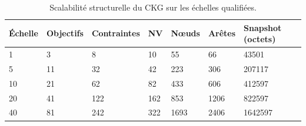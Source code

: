 \begin{table}[t]
\centering
\caption{Scalabilité structurelle du CKG sur les échelles qualifiées.}
\label{tab:v3-scalability-structural}
\small
\begin{tabular}{p{}p{}p{}p{}p{}p{}p{}}
\hline
Échelle & Objectifs & Contraintes & NV & Nœuds & Arêtes & Snapshot (octets) \\
\hline
1 & 3 & 8 & 10 & 55 & 66 & 43501 \\
5 & 11 & 32 & 42 & 223 & 306 & 207117 \\
10 & 21 & 62 & 82 & 433 & 606 & 412597 \\
20 & 41 & 122 & 162 & 853 & 1206 & 822597 \\
40 & 81 & 242 & 322 & 1693 & 2406 & 1642597 \\
\hline
\end{tabular}
\end{table}
